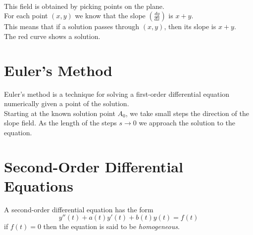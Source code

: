 \documentclass{article}
\begin{document}
\phantom{ } \\

This field is obtained by picking points on the plane. \\
For each point \((x,y)\) we know that the slope \((\frac{dy}{dx})\)
is \(x + y\). \\
This means that if a solution passes through \((x,y)\), then its slope is \(x+y\). \\
The red curve shows a solution.

\wrapfill

\section{Euler's Method}

Euler's method is a technique for solving a 
first-order differential equation numerically given a point of the solution.
\\
Starting at the known solution point \(A_0\), we take small steps the direction
of the slope field. As the length of the steps \(s \to 0\)
we approach the solution to the equation. \\

\pagebreak

\section{Second-Order Differential Equations}

A second-order differential equation has the form
\[
    y''(t)+a(t)y'(t)+b(t)y(t)=f(t)
\]
if \(f(t)=0\) then the equation is said to be \textit{homogeneous}.

\end{document}
